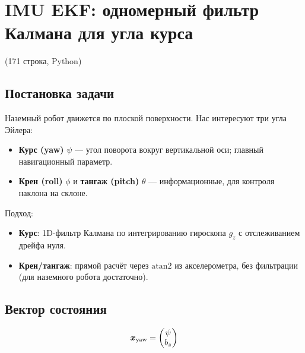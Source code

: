 \chapter{IMU EKF: одномерный фильтр Калмана для угла курса}
\label{ch:imu_ekf}

\begin{filebox}[title={Файл исходного кода}]
 \quad (171 строка, Python)
\end{filebox}

\section{Постановка задачи}

Наземный робот движется по плоской поверхности. Нас интересуют три угла Эйлера:
\begin{itemize}
  \item \textbf{Курс (yaw)} $\psi$ --- угол поворота вокруг вертикальной оси;
    главный навигационный параметр.
  \item \textbf{Крен (roll)} $\phi$ и \textbf{тангаж (pitch)} $\theta$ ---
    информационные, для контроля наклона на склоне.
\end{itemize}

Подход:
\begin{itemize}
  \item \textbf{Курс}: 1D-фильтр Калмана по интегрированию гироскопа $g_z$
    с отслеживанием дрейфа нуля.
  \item \textbf{Крен/тангаж}: прямой расчёт через $\mathrm{atan2}$ из акселерометра,
    без фильтрации (для наземного робота достаточно).
\end{itemize}

\section{Вектор состояния}

\begin{equation}
  \bm{x}_{\text{yaw}} = \begin{pmatrix} \psi \\ b_z \end{pmatrix}
  \label{eq:yaw_state}
\end{equation}

